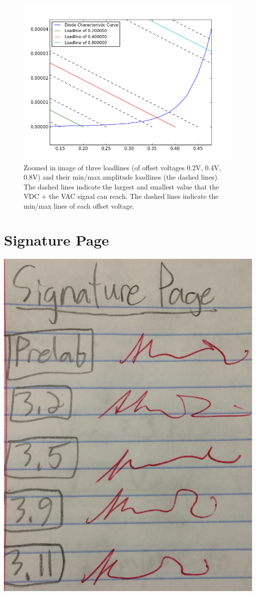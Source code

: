 \documentclass{article}
\begin{document}
    \begin{figure}[H]
        \centering
        \includegraphics[scale = 0.65]{3_17.png}
        \caption{Zoomed in image of three loadlines (of offset voltages 0.2V, 0.4V, 0.8V) and their min/max amplitude loadlines (the dashed lines). The dashed lines indicate the largest and smallest value that the VDC + the VAC signal can reach. The dashed lines indicate the min/max lines of each offset voltage.}
        \label{fig:my_label}
    \end{figure}
    

\section{Signature Page}
\centering
\includegraphics[scale = 0.1]{IMG_0197.jpg}
\end{document}
